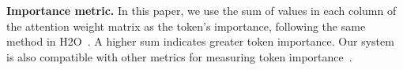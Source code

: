 
\noindent \textbf{Importance metric.} 
In this paper, we use the sum of values
in each column of the attention weight matrix as the token's importance,
following the same method in H2O~\cite{h2o-nips23}. A higher sum indicates greater
token importance. Our system is also compatible with other metrics for measuring
token importance~\cite{scissorhands-nips23, flexgen-icml23, infinigen-osdi24}.


